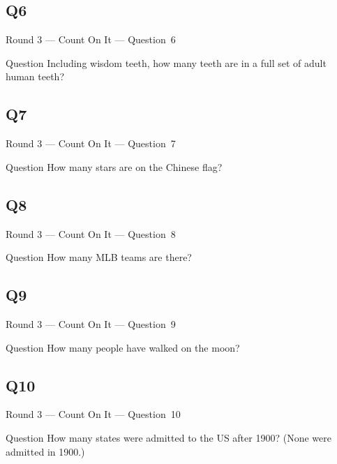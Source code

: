 \documentclass[11pt]{beamer}
\begin{document}
\subsection*{Q6}
\begin{frame}[t]{Round 3 --- Count On It --- \mbox{Question 6}}
\vspace{-0.5em}
\begin{block}{Question}
Including wisdom teeth, how many teeth are in a full set of adult human teeth?
\end{block}
\end{frame}
\subsection*{Q7}
\begin{frame}[t]{Round 3 --- Count On It --- \mbox{Question 7}}
\vspace{-0.5em}
\begin{block}{Question}
How many stars are on the Chinese flag?
\end{block}
\end{frame}
\subsection*{Q8}
\begin{frame}[t]{Round 3 --- Count On It --- \mbox{Question 8}}
\vspace{-0.5em}
\begin{block}{Question}
How many MLB teams are there?
\end{block}
\end{frame}
\subsection*{Q9}
\begin{frame}[t]{Round 3 --- Count On It --- \mbox{Question 9}}
\vspace{-0.5em}
\begin{block}{Question}
How many people have walked on the moon?
\end{block}
\end{frame}
\subsection*{Q10}
\begin{frame}[t]{Round 3 --- Count On It --- \mbox{Question 10}}
\vspace{-0.5em}
\begin{block}{Question}
How many states were admitted to the US after 1900? (None were admitted in 1900.)
\end{block}
\end{frame}
\end{document}
